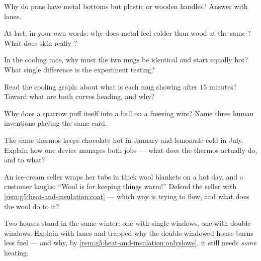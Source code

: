 \begin{exercise}[$\star$]\label{exo:g5:heat-and-insulation:4}
Why do pans have metal bottoms but plastic or wooden handles?
Answer with lanes.
\end{exercise}

\begin{exercise}[$\star$]\label{exo:g5:heat-and-insulation:5}
At last, in your own words: why does metal feel colder than wood
at the same ? What does skin really ?
\end{exercise}

\begin{exercise}[$\star$]\label{exo:g5:heat-and-insulation:6}
In the cooling race, why must the two mugs be identical and start
equally hot? What single difference is the experiment testing?
\end{exercise}

\begin{exercise}[$\star$]\label{exo:g5:heat-and-insulation:7}
Read the cooling graph: about what  is each mug showing
after $15$ minutes? Toward what  are both curves
heading, and why?
\end{exercise}

\begin{exercise}[$\star$]\label{exo:g5:heat-and-insulation:8}
Why does a sparrow puff itself into a ball on a freezing wire?
Name three human inventions playing the same card.
\end{exercise}

\begin{exercise}[$\star\star$]\label{exo:g5:heat-and-insulation:9}
The same thermos keeps chocolate hot in January and lemonade cold
in July. Explain how one device manages both jobs --- what does
the thermos actually do, and to what?
\end{exercise}

\begin{exercise}[$\star\star$]\label{exo:g5:heat-and-insulation:10}
An ice-cream seller wraps her tubs in thick wool blankets on a hot
day, and a customer laughs: ``Wool is for keeping things warm!''
Defend the seller with
\cref{rem:g5:heat-and-insulation:coat} --- which way is 
trying to flow, and what does the wool do to it?
\end{exercise}

\begin{exercise}[$\star\star$]\label{exo:g5:heat-and-insulation:11}
Two houses stand in the same winter: one with single windows, one
with double windows. Explain with lanes and trapped  why the
double-windowed house burns less fuel --- and why, by
\cref{rem:g5:heat-and-insulation:onlyslows}, it still needs
\emph{some} heating.
\end{exercise}
